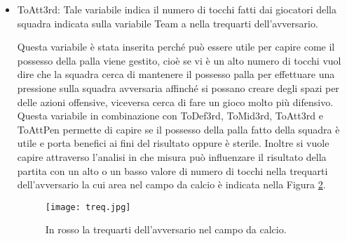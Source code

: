 \begin{itemize}
	Questa variabile è stata inserita perché può essere utile per capire come il possesso palla viene gestito, cioè se vi è un alto numero di tocchi vuol dire che la squadra cerca di mantenere il possesso palla cercando di creare delle azioni offensive, viceversa cerca di fare un gioco più difensivo. Questa variabile in combinazione con \textsf{ToDef3rd}, \textsf{ToMid3rd}, \textsf{ToAtt3rd} e \textsf{ToAttPen} permette di capire se il possesso della palla fatto dalla squadra è utile e porta benefici ai fini del risultato oppure è sterile. Inoltre si vuole capire attraverso l'analisi in che misura può influenzare il risultato della partita con un alto o un basso valore di numero di tocchi a centrocampo la cui area nel campo da calcio è indicata nella Figura \ref{fig:cen}.
	
		\begin{figure}[!h]
		\begin{center}
			\texttt{[image: cen.jpg]}
			\caption{In rosso il centrocampo nel campo da calcio.} 
			\label{fig:cen}
		\end{center}
	\end{figure}

	\item \textsf{ToAtt3rd}: Tale variabile indica il numero di tocchi fatti dai giocatori della squadra indicata sulla variabile \textsf{Team} a nella trequarti dell'avversario. 
	
	Questa variabile è stata inserita perché può essere utile per capire come il possesso della palla viene gestito, cioè se vi è un alto numero di tocchi vuol dire che la squadra cerca di mantenere il possesso palla per effettuare una pressione sulla squadra avversaria affinché si possano creare degli spazi per delle azioni offensive, viceversa cerca di fare un gioco molto più difensivo. Questa variabile in combinazione con \textsf{ToDef3rd}, \textsf{ToMid3rd}, \textsf{ToAtt3rd} e \textsf{ToAttPen} permette di capire se il possesso della palla fatto della squadra è utile e porta benefici ai fini del risultato oppure è sterile. Inoltre si vuole capire attraverso l'analisi in che misura può influenzare il risultato della partita con un alto o un basso valore di numero di tocchi nella trequarti dell'avversario la cui area nel campo da calcio è indicata nella Figura \ref{fig:treq}.
	
		\begin{figure}[!h]
		\begin{center}
			\texttt{[image: treq.jpg]}
			\caption{In rosso la trequarti dell'avversario nel campo da calcio.} 
			\label{fig:treq}
		\end{center}
	\end{figure}


\end{itemize}
